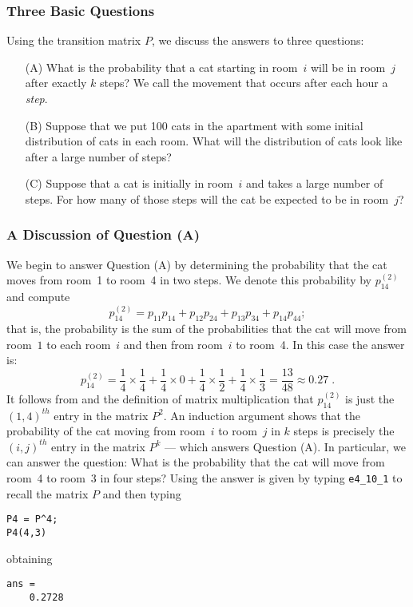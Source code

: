 \subsubsection*{Three Basic Questions}

Using the transition matrix $P$, we discuss the answers to three questions:
\begin{enumerate}
\item[(A)] What is the probability that a cat starting in room~$i$ will
be in room~$j$ after exactly $k$ steps?  We call the movement that occurs
after each hour a {\em step\/}.
\item[(B)] Suppose that we put 100 cats in the apartment with some initial
distribution of cats in each room.  What will the distribution of cats
look like after a large number of steps?
\item[(C)] Suppose that a cat is initially in room~$i$ and takes a large
number of steps.  For how many of those steps will the cat be expected to
be in room~$j$?
\end{enumerate}

\subsubsection*{A Discussion of Question (A)}

We begin to answer Question (A) by determining the probability that the
cat moves from room~1 to room~4 in two steps.  We denote this probability
by $p_{14}^{(2)}$ and compute
\begin{equation} \label{E:prob14}
p_{14}^{(2)} = p_{11}p_{14} + p_{12}p_{24} + p_{13}p_{34} + p_{14}p_{44};
\end{equation}
that is, the probability is the sum of the probabilities that the cat will
move from room~$1$ to each room~$i$ and then from room~$i$ to room~4.  In
this case the answer is:
\[
p_{14}^{(2)} = \frac{1}{4}\times\frac{1}{4} + \frac{1}{4}\times0 +
\frac{1}{4}\times\frac{1}{2} + \frac{1}{4}\times\frac{1}{3} =
\frac{13}{48} \approx 0.27\;.
\]
It follows from  and the definition of matrix multiplication
that $p_{14}^{(2)}$ is just the $(1,4)^{th}$ entry in the matrix $P^2$.  An
induction argument shows that the probability of the cat moving from
room~$i$ to room~$j$ in $k$ steps is precisely the $(i,j)^{th}$ entry in the
matrix $P^k$ --- which answers Question (A).  In particular, we can answer the
question: What is the probability that the cat will move from room~4 to room~3
in four steps?  Using \Matlab the answer is given by typing {\tt e4\_10\_1} to
recall the matrix $P$ and then typing
\begin{verbatim}
P4 = P^4;
P4(4,3)
\end{verbatim}
obtaining
\begin{verbatim}
ans =
    0.2728
\end{verbatim}

